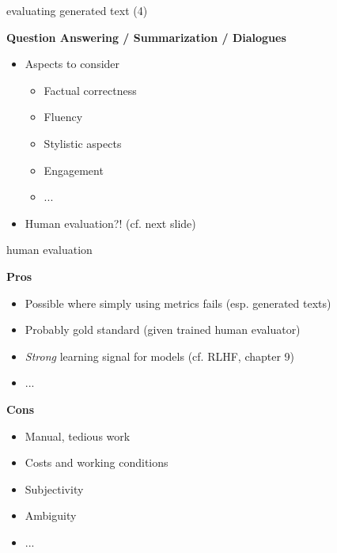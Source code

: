 \documentclass[11pt,compress,t,notes=noshow, xcolor=table]{beamer}
\begin{document}

\begin{frame}{evaluating generated text (4)}

\vfill

\textbf{Question Answering / Summarization / Dialogues}

\begin{itemize}
	\item Aspects to consider
			\begin{itemize}
				\item Factual correctness
				\item Fluency
				\item Stylistic aspects
				\item Engagement
				\item ...
			\end{itemize}
	\item Human evaluation?! (cf. next slide)
\end{itemize}

\vfill

\end{frame}


\begin{frame}{human evaluation}

\vfill

\textbf{Pros}

\begin{itemize}
	\item Possible where simply using metrics fails (esp. generated texts)
	\item Probably gold standard (given trained human evaluator)
	\item \textit{Strong} learning signal for models (cf. RLHF, chapter 9)
	\item ...
\end{itemize}

\vspace{.3cm}

\textbf{Cons}

\begin{itemize}
	\item Manual, tedious work
  \item Costs and working conditions
	\item Subjectivity
	\item Ambiguity
	\item ...
\end{itemize}

\vfill

\end{frame}


\endlecture
\end{document}
